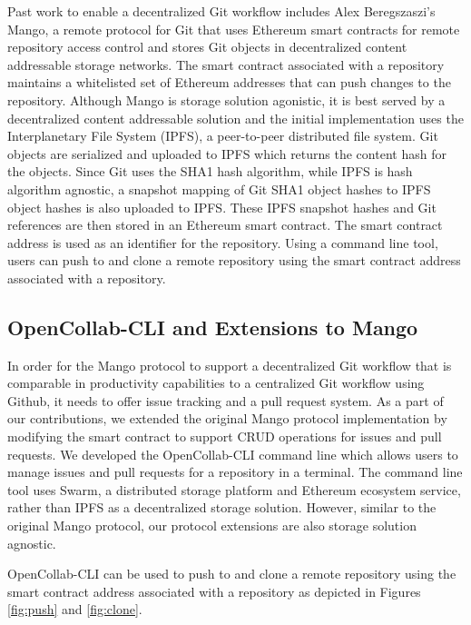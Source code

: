 Past work to enable a decentralized Git workflow includes Alex Beregszaszi's Mango, a remote protocol for Git that uses Ethereum smart contracts for remote
repository access control and stores Git objects in decentralized content addressable storage
networks\cite{mango}. The smart contract associated with a repository maintains
a whitelisted set of Ethereum addresses that can push changes to the repository. Although Mango is storage solution agonistic, it is best
served by a decentralized content addressable solution and the initial
implementation uses the Interplanetary File System (IPFS), a peer-to-peer
distributed file system\cite{ipfs}. Git objects are serialized and uploaded to
IPFS which returns the content hash for the objects. Since Git uses the SHA1
hash algorithm, while IPFS is hash algorithm agnostic, a snapshot mapping of Git
SHA1 object hashes to IPFS object hashes is also uploaded to
IPFS\cite{mangoTech}. These IPFS snapshot hashes and Git references are then
stored in an Ethereum smart contract. The smart contract address is used as an
identifier for the repository. Using a command line tool, users can push to and
clone a remote repository using the smart contract address associated with a repository.

\subsection{OpenCollab-CLI and Extensions to Mango}

In order for the Mango protocol to support a decentralized Git workflow that is
comparable in productivity capabilities to a centralized Git workflow using Github, it
needs to offer issue tracking and a pull request system. As a part of our contributions, we
extended the original Mango protocol implementation by modifying the
 smart contract to support CRUD operations for issues and
pull requests. We developed the OpenCollab-CLI command line which allows users to manage
issues and pull requests for a repository in a terminal. The command line tool uses Swarm, a distributed storage platform and Ethereum
ecosystem service, rather than IPFS as a decentralized storage
solution\cite{swarm}. However, similar to the original Mango protocol, our
protocol extensions are also storage solution agnostic.

OpenCollab-CLI can be used to push to and clone a remote repository using the
smart contract address associated with a repository as depicted in Figures
\ref{fig:push} and \ref{fig:clone}.

